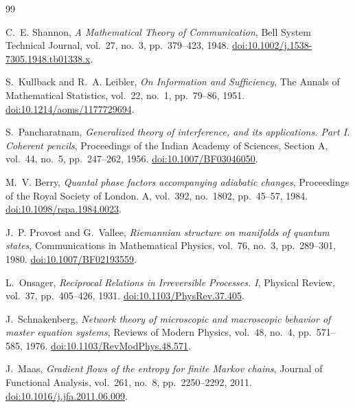 \renewcommand{\bibname}{References}
\begin{thebibliography}{99}

C.~E. Shannon,
\emph{A Mathematical Theory of Communication},
Bell System Technical Journal, vol.~27, no.~3, pp.~379--423, 1948.
\href{https://doi.org/10.1002/j.1538-7305.1948.tb01338.x}{doi:10.1002/j.1538-7305.1948.tb01338.x}.

S.~Kullback and R.~A. Leibler,
\emph{On Information and Sufficiency},
The Annals of Mathematical Statistics, vol.~22, no.~1, pp.~79--86, 1951.
\href{https://doi.org/10.1214/aoms/1177729694}{doi:10.1214/aoms/1177729694}.

S.~Pancharatnam,
\emph{Generalized theory of interference, and its applications. Part I. Coherent pencils},
Proceedings of the Indian Academy of Sciences, Section A, vol.~44, no.~5, pp.~247--262, 1956.
\href{https://doi.org/10.1007/BF03046050}{doi:10.1007/BF03046050}.

M.~V. Berry,
\emph{Quantal phase factors accompanying adiabatic changes},
Proceedings of the Royal Society of London. A, vol.~392, no.~1802, pp.~45--57, 1984.
\href{https://doi.org/10.1098/rspa.1984.0023}{doi:10.1098/rspa.1984.0023}.

J.~P. Provost and G.~Vallee,
\emph{Riemannian structure on manifolds of quantum states},
Communications in Mathematical Physics, vol.~76, no.~3, pp.~289--301, 1980.
\href{https://doi.org/10.1007/BF02193559}{doi:10.1007/BF02193559}.

L.~Onsager,
\emph{Reciprocal Relations in Irreversible Processes. I},
Physical Review, vol.~37, pp.~405--426, 1931.
\href{https://doi.org/10.1103/PhysRev.37.405}{doi:10.1103/PhysRev.37.405}.

J.~Schnakenberg,
\emph{Network theory of microscopic and macroscopic behavior of master equation systems},
Reviews of Modern Physics, vol.~48, no.~4, pp.~571--585, 1976.
\href{https://doi.org/10.1103/RevModPhys.48.571}{doi:10.1103/RevModPhys.48.571}.

J.~Maas,
\emph{Gradient flows of the entropy for finite Markov chains},
Journal of Functional Analysis, vol.~261, no.~8, pp.~2250--2292, 2011.
\href{https://doi.org/10.1016/j.jfa.2011.06.009}{doi:10.1016/j.jfa.2011.06.009}.


\end{thebibliography}
